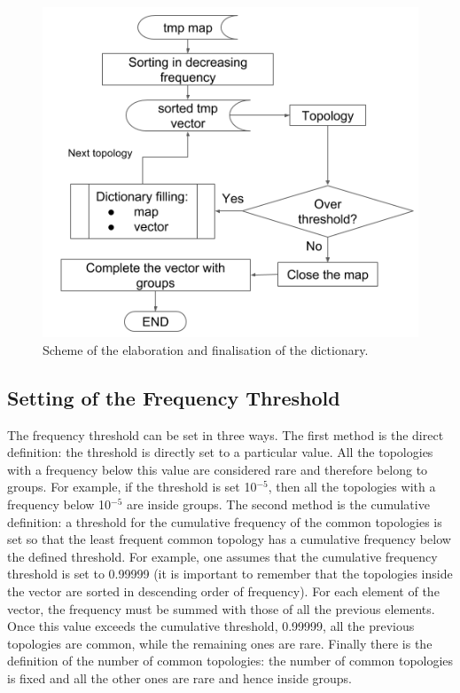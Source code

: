 %
\begin{figure}
  \centering
  \includegraphics[scale=0.6]{figures/build.png}
  \caption{Scheme of the elaboration and finalisation of the dictionary.}
  \label{fig:build}
\end{figure}
%
\subsection{Setting of the Frequency Threshold}
The frequency threshold can be set in three ways. The first method is the direct definition: the threshold is directly set to a particular value. All the topologies with a frequency below this value are considered rare and therefore belong to groups. For example, if the threshold is set 10$^{-5}$, then all the topologies with a frequency below 10$^{-5}$ are inside groups. The second method is the cumulative definition: a threshold for the cumulative frequency of the common topologies is set so that the least frequent common topology has a cumulative frequency below the defined threshold. For example, one assumes that the cumulative frequency threshold is set to 0.99999 (it is important to remember that the topologies inside the vector are sorted in descending order of frequency). For each element of the vector, the frequency must be summed with those of all the previous elements. Once this value exceeds the cumulative threshold, 0.99999, all the previous topologies are common, while the remaining ones are rare. Finally there is the definition of the number of common topologies: the number of common topologies is fixed and all the other ones are rare and hence inside groups.
